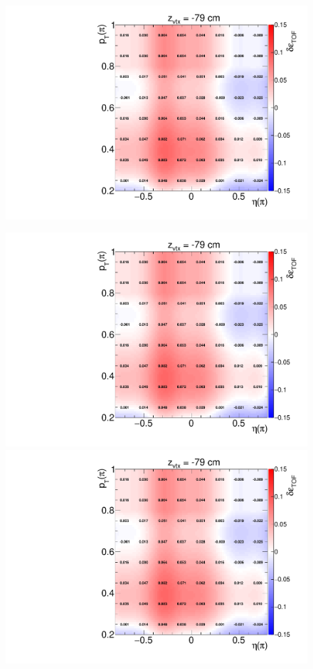 \begin{figure}[ht]
{		\includegraphics[width=\linewidth,page=76]{graphics/systematicsEfficiency/TOF_tagAndProbe/correction/TofEffCorrection3D_pion.pdf}
	}%
	\parbox{0.325\textwidth}{
		\centering
		\includegraphics[width=\linewidth,page=66]{graphics/systematicsEfficiency/TOF_tagAndProbe/correction/TofEffCorrection3D_pion.pdf}\\
		\includegraphics[width=\linewidth,page=80]{graphics/systematicsEfficiency/TOF_tagAndProbe/correction/TofEffCorrection3D_pion.pdf}
	}%
\end{figure}


